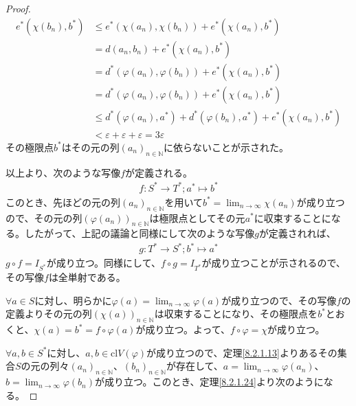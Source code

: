 \documentclass[dvipdfmx]{jsarticle}
\begin{document}
\begin{proof}
\begin{align*}
e^{*}\left( \chi\left( b_{n} \right),b^{*} \right) &\leq e^{*}\left( \chi\left( a_{n} \right),\chi\left( b_{n} \right) \right) + e^{*}\left( \chi\left( a_{n} \right),b^{*} \right)\\
&= d\left( a_{n},b_{n} \right) + e^{*}\left( \chi\left( a_{n} \right),b^{*} \right)\\
&= d^{*}\left( \varphi\left( a_{n} \right),\varphi\left( b_{n} \right) \right) + e^{*}\left( \chi\left( a_{n} \right),b^{*} \right)\\
&= d^{*}\left( \varphi\left( a_{n} \right),\varphi\left( b_{n} \right) \right) + e^{*}\left( \chi\left( a_{n} \right),b^{*} \right)\\
&\leq d^{*}\left( \varphi\left( a_{n} \right),a^{*} \right) + d^{*}\left( \varphi\left( b_{n} \right),a^{*} \right) + e^{*}\left( \chi\left( a_{n} \right),b^{*} \right)\\
&< \varepsilon + \varepsilon + \varepsilon = 3\varepsilon
\end{align*}
その極限点$b^{*}$はその元の列$\left( a_{n} \right)_{n \in \mathbb{N}}$に依らないことが示された。\par
以上より、次のような写像$f$が定義される。
\begin{align*}
f:S^{*} \rightarrow T^{*};a^{*} \mapsto b^{*}
\end{align*}
このとき、先ほどの元の列$\left( a_{n} \right)_{n \in \mathbb{N}}$を用いて$b^{*} = \lim_{n \rightarrow \infty}{\chi\left( a_{n} \right)}$が成り立つので、その元の列$\left( \varphi\left( a_{n} \right) \right)_{n \in \mathbb{N}}$は極限点としてその元$a^{*}$に収束することになる。したがって、上記の議論と同様にして次のような写像$g$が定義されれば、
\begin{align*}
g:T^{*} \rightarrow S^{*};b^{*} \mapsto a^{*}
\end{align*}
$g \circ f = I_{S^{*}}$が成り立つ。同様にして、$f \circ g = I_{T^{*}}$が成り立つことが示されるので、その写像$f$は全単射である。\par
$\forall a \in S$に対し、明らかに$\varphi(a) = \lim_{n \rightarrow \infty}{\varphi(a)}$が成り立つので、その写像$f$の定義よりその元の列$\left( \chi(a) \right)_{n \in \mathbb{N}}$は収束することになり、その極限点を$b^{*}$とおくと、$\chi(a) = b^{*} = f \circ \varphi(a)$が成り立つ。よって、$f \circ \varphi = \chi$が成り立つ。\par
$\forall a,b \in S^{*}$に対し、$a,b \in {\mathrm{cl}}{V(\varphi)}$が成り立つので、定理\ref{8.2.1.13}よりあるその集合$S$の元の列々$\left( a_{n} \right)_{n \in \mathbb{N}}$、$\left( b_{n} \right)_{n \in \mathbb{N}}$が存在して、$a = \lim_{n \rightarrow \infty}{\varphi\left( a_{n} \right)}$、$b = \lim_{n \rightarrow \infty}{\varphi\left( b_{n} \right)}$が成り立つ。このとき、定理\ref{8.2.1.24}より次のようになる。

\end{proof}
\end{document}
